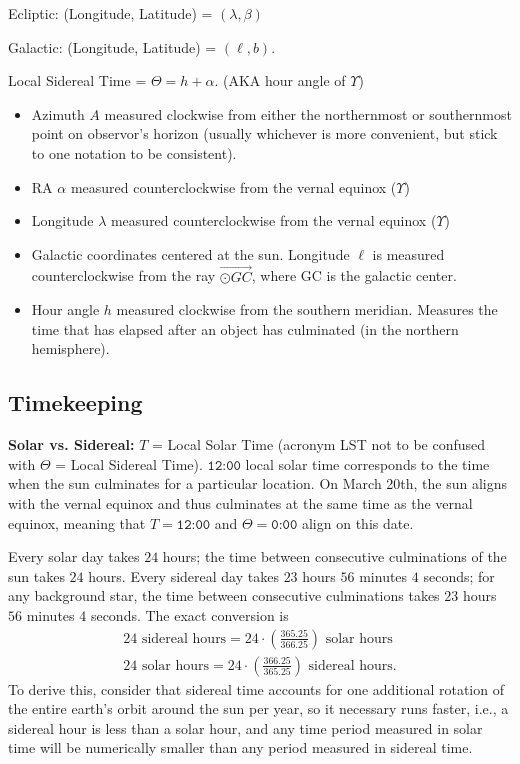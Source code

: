\documentclass[12pt]{article}
\newcommand{\V}{

\vspace{\baselineskip}

}
\begin{document}
Ecliptic: (Longitude, Latitude) = $(\lambda, \beta)$

Galactic: (Longitude, Latitude) = $(\ell, b)$. 

Local Sidereal Time = $\Theta = h + \alpha$. (AKA hour angle of $\Upsilon$)

\begin{itemize}
\item Azimuth $A$ measured clockwise from either the northernmost or southernmost point on observor's horizon (usually whichever is more convenient, but stick to one notation to be consistent). 

\item RA $\alpha$ measured counterclockwise from the vernal equinox ($\Upsilon$)

\item Longitude $\lambda$ measured counterclockwise from the vernal equinox ($\Upsilon$)

\item Galactic coordinates centered at the sun. Longitude $\ell$ is measured counterclockwise from the ray $\overrightarrow{\odot GC}$, where GC is the galactic center.

\item Hour angle $h$ measured clockwise from the southern meridian. Measures the time that has elapsed after an object has culminated (in the northern hemisphere).
\end{itemize}

\subsection{Timekeeping}

\textbf{Solar vs. Sidereal:} $T$ = Local Solar Time (acronym LST not to be confused with $\Theta$ = Local Sidereal Time). $\texttt{12:00}$ local solar time corresponds to the time when the sun culminates for a particular location. On March 20th, the sun aligns with the vernal equinox and thus culminates at the same time as the vernal equinox, meaning that $T = \texttt{12:00}$ and $\Theta = \texttt{0:00}$ align on this date.

Every solar day takes $24$ hours; the time between consecutive culminations of the sun takes $24$ hours. Every sidereal day takes $23$ hours $56$ minutes $4$ seconds; for any background star, the time between consecutive culminations takes $23$ hours $56$ minutes $4$ seconds. The exact conversion is 
\begin{gather*}
    24\text{ sidereal hours} = 24\cdot \left(\frac{365.25}{366.25}\right)\text{ solar hours} \\
    24\text{ solar hours} = 24\cdot \left(\frac{366.25}{365.25}\right)\text{ sidereal hours}. 
\end{gather*}
To derive this, consider that sidereal time accounts for one additional rotation of the entire earth's orbit around the sun per year, so it necessary runs faster, i.e., a sidereal hour is less than a solar hour, and any time period measured in solar time will be numerically smaller than any period measured in sidereal time.\V
\end{document}
